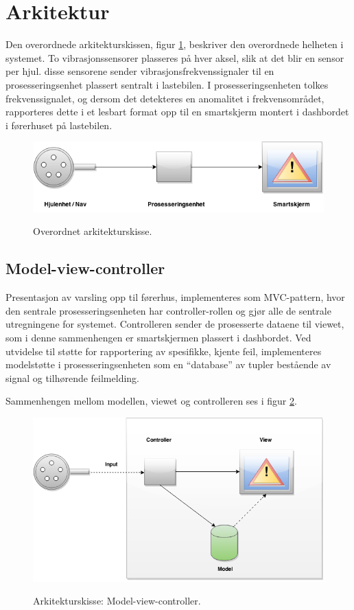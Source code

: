 \section{Arkitektur}
Den overordnede arkitekturskissen, figur \ref{fig:overordnet-ark}, 
beskriver den overordnede helheten i systemet. To vibrasjonssensorer plasseres
på hver aksel, slik at det blir en sensor per hjul. disse sensorene sender 
vibrasjonsfrekvenssignaler til en prosesseringsenhet plassert sentralt i lastebilen. 
I prosesseringsenheten tolkes frekvenssignalet, og dersom det detekteres en 
anomalitet i frekvensområdet, rapporteres dette i et lesbart format opp til en 
smartskjerm montert i dashbordet i førerhuset på lastebilen.
\newline
\begin{figure}[H]
	\centering
	\includegraphics[width=1.00\textwidth]{images/arkitektur-overordnet.png}
	\label{fig:overordnet-ark}
	\caption{Overordnet arkitekturskisse.}
\end{figure}

\subsection{Model-view-controller}
\label{sec:arkitektur}
Presentasjon av varsling opp til førerhus, implementeres som MVC-pattern, 
hvor den sentrale prosesseringsenheten har controller-rollen og gjør alle 
de sentrale utregningene for systemet. Controlleren sender de prosesserte 
dataene til viewet, som i denne sammenhengen er smartskjermen plassert i 
dashbordet. Ved utvidelse til støtte for rapportering av spesifikke, 
kjente feil, implementeres modelstøtte i prosesseringsenheten som en 
``database'' av tupler bestående av signal og tilhørende feilmelding. 

Sammenhengen mellom modellen, viewet og controlleren ses i figur \ref{fig:mvc}.
\newline
\begin{figure}[H]
	\centering
	\includegraphics[width=1.00\textwidth]{images/architecture2-mvc.png}
	\label{fig:mvc}
	\caption{Arkitekturskisse: Model-view-controller.}
\end{figure}
